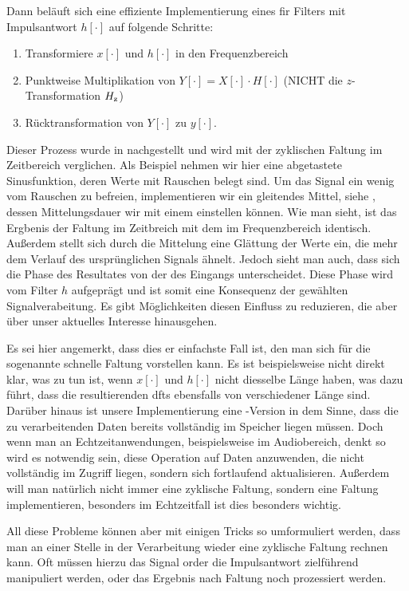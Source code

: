 Dann beläuft sich eine effiziente Implementierung eines \gls{fir} Filters mit Impulsantwort $h[\cdot]$ auf folgende Schritte:
\begin{enumerate}
    \item Transformiere $x[\cdot]$ und $h[\cdot]$ in den Frequenzbereich
    \item Punktweise Multiplikation von $Y[\cdot] = X[\cdot] \cdot H[\cdot]$ (NICHT die $z$-Transformation $H_{{\rm z}}$)
    \item Rücktransformation von $Y[\cdot]$ zu $y[\cdot]$.
\end{enumerate}
%
Dieser Prozess wurde in  nachgestellt und wird mit der zyklischen Faltung im Zeitbereich verglichen.
Als Beispiel nehmen wir hier eine abgetastete Sinusfunktion, deren Werte mit Rauschen belegt sind.
Um das Signal ein wenig vom Rauschen zu befreien, implementieren wir ein gleitendes Mittel, siehe , dessen Mittelungsdauer wir mit einem  einstellen können.
Wie man sieht, ist das Ergbenis der Faltung im Zeitbreich mit dem im Frequenzbereich identisch.
Außerdem stellt sich durch die Mittelung eine Glättung der Werte ein, die mehr dem Verlauf des ursprünglichen Signals ähnelt.
Jedoch sieht man auch, dass sich die Phase des Resultates von der des Eingangs unterscheidet.
Diese Phase wird vom Filter $h$ aufgeprägt und ist somit eine Konsequenz der gewählten Signalverabeitung.
Es gibt Möglichkeiten diesen Einfluss zu reduzieren, die aber über unser aktuelles Interesse hinausgehen.

Es sei hier angemerkt, dass dies er einfachste Fall ist, den man sich für die sogenannte schnelle Faltung vorstellen kann.
Es ist beispielsweise nicht direkt klar, was zu tun ist, wenn $x[\cdot]$ und $h[\cdot]$ nicht diesselbe Länge haben, was dazu führt, dass die resultierenden \glspl{dft} ebensfalls von verschiedener Länge sind.
Darüber hinaus ist unsere Implementierung eine -Version in dem Sinne, dass die zu verarbeitenden Daten bereits vollständig im Speicher liegen müssen.
Doch wenn man an Echtzeitanwendungen, beispielsweise im Audiobereich, denkt so wird es notwendig sein, diese Operation auf Daten anzuwenden, die nicht vollständig im Zugriff liegen, sondern sich fortlaufend aktualisieren.
Außerdem will man natürlich nicht immer eine zyklische Faltung, sondern eine  Faltung implementieren, besonders im Echtzeitfall ist dies besonders wichtig.

All diese Probleme können aber mit einigen Tricks so umformuliert werden, dass man an einer Stelle in der Verarbeitung wieder eine zyklische Faltung rechnen kann.
Oft müssen hierzu das Signal order die Impulsantwort zielführend manipuliert werden, oder das Ergebnis nach Faltung noch prozessiert werden.

